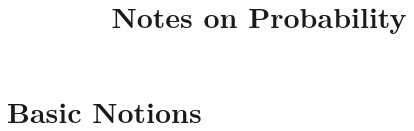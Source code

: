 \documentclass[12pt]{article}
\title{Notes on Probability}
\author{}
\theoremstyle{definition}
\begin{document}
\maketitle
\tableofcontents
\newpage
\section{Basic Notions}
\end{document}
